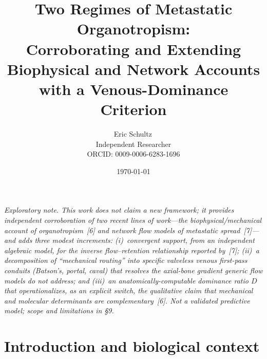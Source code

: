 \documentclass[11pt]{article}
\title{\textbf{Two Regimes of Metastatic Organotropism:\\ Corroborating and Extending Biophysical and Network Accounts\\ with a Venous-Dominance Criterion}}
\author{%
  Eric Schultz\,\orcidlink{0009-0006-6283-1696}\\
  \small Independent Researcher\\
  \small ORCID: 0009-0006-6283-1696
}
\date{\today}
\begin{document}
\maketitle
\vspace{-2em}

\begin{center}
\footnotesize
{}
\end{center}
\vspace{1em}

\begin{center}
\emph{Exploratory note. This work does not claim a new framework; it provides
independent corroboration of two recent lines of work---the biophysical/mechanical
account of organotropism~[6] and network flow models of metastatic spread~[7]---and
adds three modest increments: (i)~convergent support, from an independent algebraic
model, for the inverse flow--retention relationship reported by~[7]; (ii)~a
decomposition of ``mechanical routing'' into specific valveless venous first-pass
conduits (Batson's, portal, caval) that resolves the axial-bone gradient generic
flow models do not address; and (iii)~an anatomically-computable dominance ratio $D$
that operationalizes, as an explicit switch, the qualitative claim that mechanical
and molecular determinants are complementary~[6]. Not a validated predictive model;
scope and limitations in \S9.}
\end{center}
\vspace{1em}

\section{Introduction and biological context}
\end{document}

